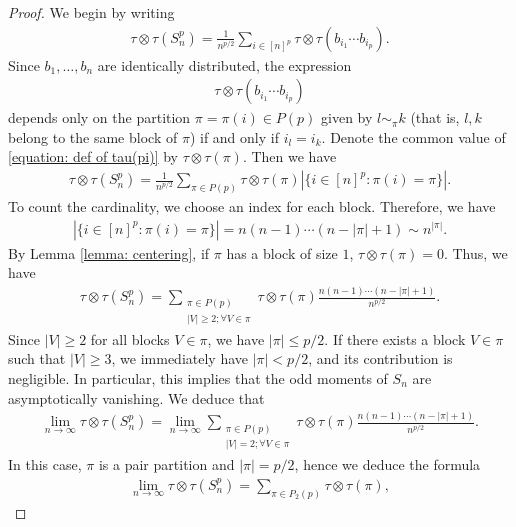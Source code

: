\documentclass[12pt,reqno]{amsart}
\theoremstyle{plain}
\newcommand{\1}{\mathbf{1}}
\begin{document}
\begin{proof}
  We begin by writing
    \begin{align*}
        \tau\otimes \tau(S_n^p)=\frac{1}{n^{p/2}}\sum_{i \in [n]^p}\tau\otimes \tau (b_{i_1}\cdots b_{i_p}).
    \end{align*}
    Since $b_{1},\ldots,b_n$ are identically distributed, the expression
    \begin{align}\label{equation: def of tau(pi)}
        \tau\otimes \tau (b_{i_1}\cdots b_{i_p})
    \end{align}
    depends only on the partition $\pi=\pi(i) \in P(p)$ given by $l \sim_\pi k $ (that is, $l,k$ belong to the same block of $\pi$) if and only if $i_l=i_k$. Denote the common value of \eqref{equation: def of tau(pi)} by $\tau\otimes \tau(\pi)$. Then we have
    \begin{align*}
        \tau\otimes \tau(S_n^p)=\frac{1}{n^{p/2}}\sum_{\pi \in P(p)}\tau\otimes \tau(\pi)|\{i \in [n]^p: \pi(i)=\pi\}|.
    \end{align*}
    To count the cardinality, we choose an index for each block. Therefore, we have
    \begin{align*}
        |\{i \in [n]^p: \pi(i)=\pi\}|=n(n-1)\cdots (n-|\pi|+1) \sim n^{|\pi|}.
    \end{align*}
    By Lemma \ref{lemma: centering}, if $\pi$ has a block of size $1$, $\tau\otimes \tau(\pi)=0$. Thus, we have
    \begin{align*}
        \tau\otimes \tau(S_n^p)=\sum_{\substack{\pi \in P(p)\\ |V| \ge 2; \forall V \in \pi}}\tau\otimes \tau(\pi)\frac{n(n-1)\cdots (n-|\pi|+1) }{n^{p/2}}.
    \end{align*}
    Since $|V| \ge 2$ for all blocks $V \in \pi$, we have $|\pi| \le p/2$. If there exists a block $V \in \pi$ such that $|V| \ge 3$, we immediately have $|\pi|<p/2$, and its contribution is negligible. In particular, this implies that the odd moments of $S_n$ are asymptotically vanishing. We deduce that
    \begin{align*}
        \lim_{n \to \infty}\tau\otimes \tau(S_n^p)=\lim_{n\to \infty}\sum_{\substack{\pi \in P(p)\\ |V| = 2; \forall V \in \pi}}\tau\otimes \tau(\pi)\frac{n(n-1)\cdots (n-|\pi|+1) }{n^{p/2}}.
    \end{align*}
    In this case, $\pi$ is a pair partition and $|\pi|=p/2$, hence we deduce the formula
    \begin{align*}
        \lim_{n \to \infty}\tau\otimes \tau(S_n^p)=\sum_{\pi \in P_2(p)}\tau\otimes \tau(\pi),

\end{align*}
\end{proof}
\end{document}
